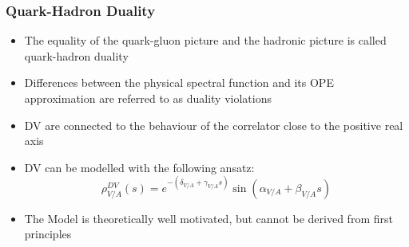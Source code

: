\documentclass{beamer}
\begin{document}
\begin{frame}
  \frametitle{Quark-Hadron Duality}
  \begin{itemize}
  \item The equality of the quark-gluon picture and the hadronic picture is
    called quark-hadron duality
  \item Differences between the physical spectral function and its OPE
    approximation are referred to as duality violations
  \item DV are connected to the behaviour of the correlator close to the
    positive real axis
    
    \vfill

  \item DV can be modelled with the following ansatz:
    \begin{equation}
      \rho_{V/A}^{DV}(s) = e^{-(\delta_{V/A} + \gamma_{V/A}s)} \sin(\alpha_{V/A} + \beta_{V/A}s)
    \end{equation}
    \begin{scriptsize}
      \cite{Boito2011a}
    \end{scriptsize}
  \item The Model is theoretically well motivated, but cannot be derived from
    first principles
  \end{itemize}
\end{frame}
\end{document}
